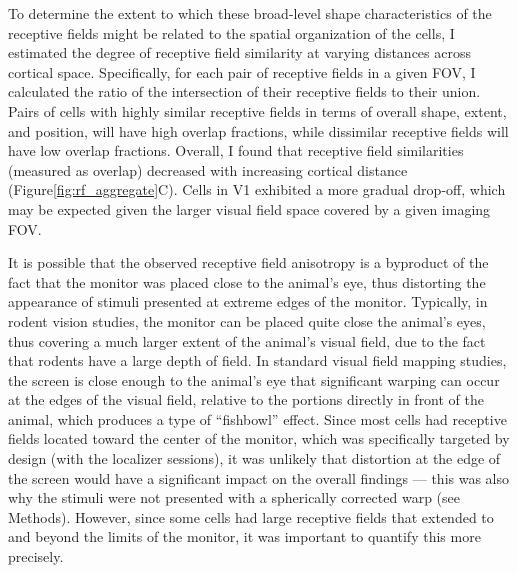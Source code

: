 To determine the extent to which these broad-level shape characteristics of the receptive fields might be related to the spatial organization of the cells, I estimated the degree of receptive field similarity at varying distances across cortical space. Specifically, for each pair of receptive fields in a given FOV, I calculated the ratio of the intersection of their receptive fields to their union. Pairs of cells with highly similar receptive fields in terms of overall shape, extent, and position, will have high overlap fractions, while dissimilar receptive fields will have low overlap fractions. Overall, I found that receptive field similarities (measured as overlap) decreased with increasing cortical distance (Figure\ref{fig:rf_aggregate}C). Cells in V1 exhibited a more gradual drop-off, which may be expected given the larger visual field space covered by a given imaging FOV. 



It is possible that the observed receptive field anisotropy is a byproduct of the fact that the monitor was placed close to the animal's eye, thus distorting the appearance of stimuli presented at extreme edges of the monitor. Typically, in rodent vision studies, the monitor can be placed quite close the animal's eyes, thus covering a much larger extent of the animal's visual field, due to the fact that rodents have a large depth of field\cite{Blakema1982}. In standard visual field mapping studies, the screen is close enough to the animal's eye that significant warping can occur at the edges of the visual field, relative to the portions directly in front of the animal, which produces a type of ``fishbowl'' effect. Since most cells had receptive fields located toward the center of the monitor, which was specifically targeted by design (with the localizer sessions), it was unlikely that distortion at the edge of the screen would have a significant impact on the overall findings --- this was also why the stimuli were not presented with a spherically corrected warp (see Methods). However, since some cells had large receptive fields that extended to and beyond the limits of the monitor, it was important to quantify this more precisely. 

